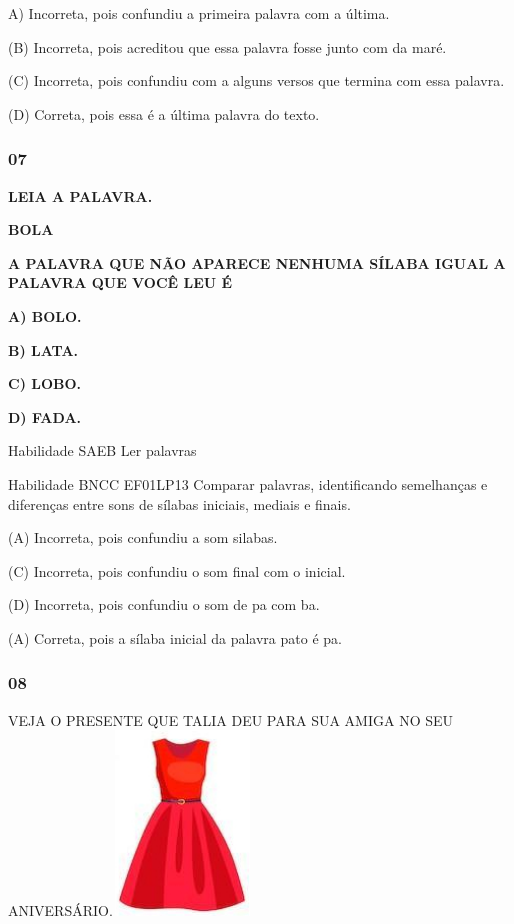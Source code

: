 \begin{escola}
A) Incorreta, pois confundiu a primeira palavra com a última.

(B) Incorreta, pois acreditou que essa palavra fosse junto com da maré.

(C) Incorreta, pois confundiu com a alguns versos que termina com essa
palavra.

(D) Correta, pois essa é a última palavra do texto.

\subsubsection{07}\label{section-63}

\textbf{LEIA A PALAVRA.}

\textbf{BOLA}

\textbf{A PALAVRA QUE NÃO APARECE NENHUMA SÍLABA IGUAL A PALAVRA QUE
VOCÊ LEU É}

\textbf{A) BOLO.}

\textbf{B) LATA.}

\textbf{C) LOBO.}

\textbf{D) FADA.}

Habilidade SAEB Ler palavras

Habilidade BNCC EF01LP13 Comparar palavras, identificando semelhanças e
diferenças entre sons de sílabas iniciais, mediais e finais.

(A) Incorreta, pois confundiu a som silabas.

(C) Incorreta, pois confundiu o som final com o inicial.

(D) Incorreta, pois confundiu o som de pa com ba.

(A) Correta, pois a sílaba inicial da palavra pato é
pa.\protect\hypertarget{_heading=h.7lb9brf4wytg}{}{}

\subsubsection{08 }\label{section-64}

VEJA O PRESENTE QUE TALIA DEU PARA SUA AMIGA NO SEU
ANIVERSÁRIO.\includegraphics[width=1.45972in,height=1.93403in]{media/image232.jpg}


\end{escola}
